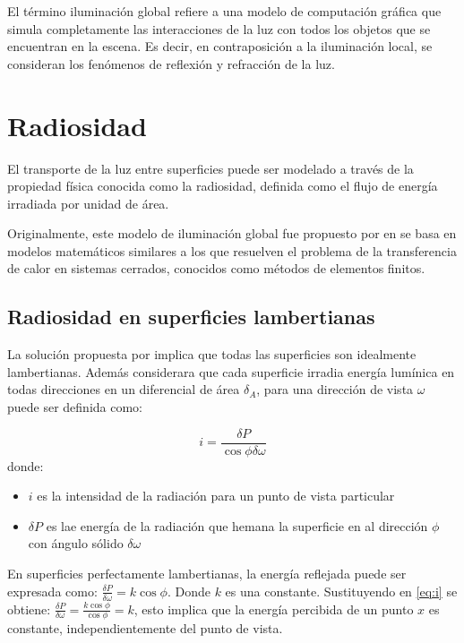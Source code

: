 El término iluminación global refiere a una modelo de
computación gráfica que simula completamente las interacciones de la luz con todos los objetos que se encuentran 
en la escena. Es decir, en contraposición a la iluminación local, se consideran los fenómenos de
reflexión y refracción de la luz.

\section{Radiosidad}
\label{sec:radiosidad}

El transporte de la luz entre superficies puede ser modelado a través de la propiedad física conocida como
la radiosidad, definida como el flujo de energía irradiada por unidad de área. 

Originalmente, este modelo de iluminación global fue propuesto por \citeauthor{Goral} en \citeyear{Goral} se basa en modelos matemáticos
similares a los que resuelven el problema de la transferencia de calor en sistemas cerrados, conocidos como métodos de elementos finitos.

\subsection{Radiosidad en superficies lambertianas}

La solución propuesta por \citeauthor{Goral} implica que todas las superficies son idealmente lambertianas. Además considerara
que cada superficie irradia energía lumínica en todas direcciones en un diferencial de área $\delta_{A}$, para una dirección de vista $\omega$ puede ser definida como:

\begin{equation}
    i = \frac{\delta{P}}{\cos{\phi\delta\omega}} \label{eq:i}
\end{equation}
donde:
\begin{itemize}
    \item $i$ es la intensidad de la radiación para un punto de vista particular
    \item $\delta{P}$ es lae energía de la radiación que hemana la superficie en al dirección $\phi$ con ángulo sólido $\delta\omega$
\end{itemize}

En superficies perfectamente lambertianas, la energía reflejada puede ser expresada como: $\frac{\delta{P}}{\delta{\omega}} = k\cos{\phi}$. Donde $k$ es una constante.
Sustituyendo en \eqref{eq:i} se obtiene: $\frac{\delta{P}}{\delta{\omega}} = \frac{k\cos{\phi}}{\cos{\phi}} = k$, esto implica que la energía percibida de un punto $x$ 
es constante, independientemente del punto de vista.


